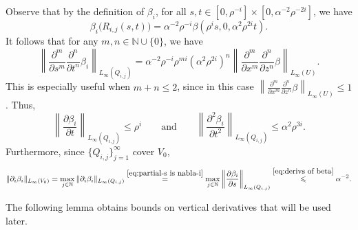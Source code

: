 \documentclass[11pt,reqno]{amsart}
\newcommand{\N}{\mathbb{N}}
\newcommand{\0}{\mathbf{0}}
\renewcommand{\1}{\mathbf 1}
\renewcommand{\le}{\leqslant}
\theoremstyle{remark}
\newcommand{\pd}[2]{\frac{\partial #2}{\partial #1}}
\begin{document}
Observe that by the definition of $\beta_i$, for all $s,t\in [0,\rho^{-i}]\times [0,\alpha^{-2} \rho^{-2i}]$, we have
$$\beta_i\big(R_{i,j}(s,t)\big)=\alpha^{-2} \rho^{-i} \beta(\rho^i s,0,\alpha^2 \rho^{2i} t).$$
It follows that for any $m,n\in \N\cup\{0\}$, we have
\begin{equation}\label{eq:derivs of beta}
  \left\|\frac{\partial^m}{\partial s^m}\frac{\partial^n}{\partial t^n} \beta_i\right\|_{L_\infty(Q_{i,j})}= \alpha^{-2} \rho^{-i}\rho^{mi} (\alpha^2 \rho^{2i})^n\left\|\frac{\partial^m}{\partial x^m}\frac{\partial^n}{\partial z^n}\beta\right\|_{L_\infty(U)}.
\end{equation}
This is especially useful when $m+n\le 2$, since in this case $\left\|\frac{\partial^m}{\partial x^m}\frac{\partial^n}{\partial z^n}\beta\right\|_{L_\infty(U)}\le 1$.  Thus,
\begin{equation}\label{eq:first two der betai}
 \left\|\frac{\partial \beta_i}{\partial t} \right\|_{L_\infty(Q_{i,j})}\le \rho^i\qquad\mathrm{and} \qquad  \left\|\frac{\partial^2\beta_i}{\partial t^2} \right\|_{L_\infty(Q_{i,j})}\le \alpha^2\rho^{3i}.
\end{equation}
Furthermore, since $\{Q_{i,j}\}_{j=1}^\infty$ cover $V_0$,
\begin{equation}\label{eq:bound nabla beta}
  \|\partial_i\beta_i\|_{L_\infty(V_0)}=\max_{j\in \N} \|\partial_i\beta_i\|_{L_\infty(Q_{i,j})}\stackrel{\eqref{eq:partial-s is nabla-i}}{=}\max_{j\in \N}\left\|\pd{s}{\beta_i}\right\|_{L_\infty(Q_{i,j})}\stackrel{\eqref{eq:derivs of beta}}{\le} \alpha^{-2}.
\end{equation}

The following lemma obtains  bounds on vertical derivatives that will be used later.
\end{document}
